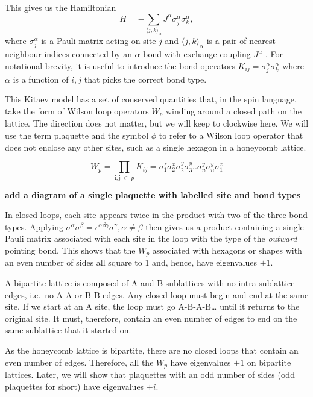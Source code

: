 This gives us the Hamiltonian \[H =  - \sum_{\langle j,k\rangle_\alpha} J^{\alpha}\sigma_j^{\alpha}\sigma_k^{\alpha},\] where \(\sigma^\alpha_j\) is a Pauli matrix acting on site \(j\) and \(\langle j,k\rangle_\alpha\) is a pair of nearest-neighbour indices connected by an \(\alpha\)-bond with exchange coupling \(J^\alpha\) \textcite{kitaevAnyonsExactlySolved2006}. For notational brevity, it is useful to introduce the bond operators \(K_{ij} = \sigma_j^{\alpha}\sigma_k^{\alpha}\) where \(\alpha\) is a function of \(i,j\) that picks the correct bond type.

This Kitaev model has a set of conserved quantities that, in the spin language, take the form of Wilson loop operators \(W_p\) winding around a closed path on the lattice. The direction does not matter, but we will keep to clockwise here. We will use the term plaquette and the symbol \(\phi\) to refer to a Wilson loop operator that does not enclose any other sites, such as a single hexagon in a honeycomb lattice.

\[W_p = \prod_{\mathrm{i,j}\; \in\; p} K_{ij} = \sigma_1^z \sigma_2^x \sigma_2^y \sigma_3^y .. \sigma_n^y \sigma_n^y \sigma_1^z\]

\textbf{add a diagram of a single plaquette with labelled site and bond types}

In closed loops, each site appears twice in the product with two of the three bond types. Applying \(\sigma^\alpha \sigma^\beta = \epsilon^{\alpha \beta \gamma} \sigma^\gamma, \alpha \neq \beta\) then gives us a product containing a single Pauli matrix associated with each site in the loop with the type of the \emph{outward} pointing bond. This shows that the \(W_p\) associated with hexagons or shapes with an even number of sides all square to 1 and, hence, have eigenvalues \(\pm 1\).

A bipartite lattice is composed of A and B sublattices with no intra-sublattice edges, i.e.~no A-A or B-B edges. Any closed loop must begin and end at the same site. If we start at an A site, the loop must go A-B-A-B\ldots{} until it returns to the original site. It must, therefore, contain an even number of edges to end on the same sublattice that it started on.

As the honeycomb lattice is bipartite, there are no closed loops that contain an even number of edges. Therefore, all the \(W_p\) have eigenvalues \(\pm 1\) on bipartite lattices. Later, we will show that plaquettes with an odd number of sides (odd plaquettes for short) have eigenvalues \(\pm i\).

